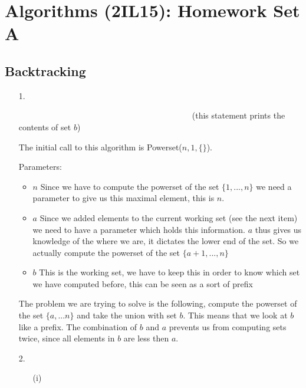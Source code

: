 \documentclass{article}
\title{}
\author{Mart Pluijmaekers}
\date{15-5-2012}
\begin{document}
\section*{Algorithms (2IL15): Homework Set A}

\subsection*{Backtracking}
\begin{itemize}
\item[1.]\begin{algorithmic}[1]
\ \ \ \ \ \ \ \ \ \ \ \ \ \ \ \ \ \ \ \ \ \ \ \ \ \ \ \ \ \ \ \ \ \ \ \ \ \ \ \ \ \ (this statement prints the contents of set $b$)
\ENDFOR
\end{algorithmic}
The initial call to this algorithm is Powerset($n, 1, \{\}$).

Parameters:
\begin{itemize}
\item{$n$} Since we have to compute the powerset of the set $\{1,...,n\}$ we need a parameter to give us this maximal element, this is $n$.
\item{$a$} Since we added elements to the current working set (see the next item) we need to have a parameter which holds this information. $a$ thus gives us knowledge of the where we are, it dictates the lower end of the set. So we actually compute the powerset of the set $\{a+1,...,n\}$
\item{$b$} This is the working set, we have to keep this in order to know which set we have computed before, this can be seen as a sort of prefix 
\end{itemize}

The problem we are trying to solve is the following, compute the powerset of the set $\{a,...n\}$ and take the union with set $b$. This means that we look at $b$ like a prefix. The combination of $b$ and $a$ prevents us from computing sets twice, since all elements in $b$ are less then $a$.

\item[2.] 
\begin{itemize}

\item[(i)]
\begin{algorithmic}[1]
\ENDFOR
{}
\end{algorithmic} 


\end{itemize}
\end{itemize}
\end{document}
